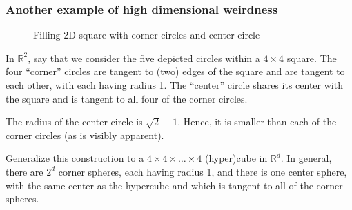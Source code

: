 \documentclass[smaller]{beamer}
\theoremstyle{example}
\newcommand{\x}{\textbf{x}}
\begin{document}
\begin{frame}
    \frametitle{Another example of high dimensional weirdness}

    \begin{figure}
        \begin{center}
        \end{center}
        \caption{Filling 2D square with corner circles and center circle}
    \end{figure}

    In $\mathbb R^2$, say that we consider the five depicted circles within a $4\times 4$ square. The four ``corner'' circles are tangent to (two) edges of the square and are tangent to each other, with each having radius 1. The ``center'' circle shares its center with the square and is tangent to all four of the corner circles.

    The radius of the center circle is $\sqrt{2} - 1$. Hence, it is smaller than each of the corner circles (as is visibly apparent).

    Generalize this construction to a $4\times 4\times \ldots \times 4$ (hyper)cube in $\mathbb R^d$. In general, there are $2^d$ corner spheres, each having radius 1, and there is one center sphere, with the same center as the hypercube and which is tangent to all of the corner spheres.
\end{frame}
\end{document}
